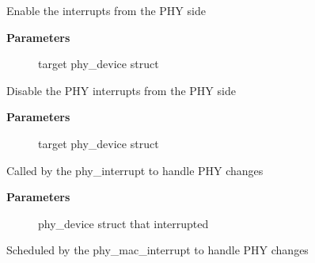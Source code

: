 \documentclass[a4paper,8pt,english]{sphinxmanual}
\begin{document}
\begin{fulllineitems}
\label{networking/kapi:c.phy_enable_interrupts}
Enable the interrupts from the PHY side

\end{fulllineitems}


\textbf{Parameters}
\begin{description}
\item[{}] \leavevmode
target phy\_device struct

\end{description}

\begin{fulllineitems}
\label{networking/kapi:c.phy_disable_interrupts}
Disable the PHY interrupts from the PHY side

\end{fulllineitems}


\textbf{Parameters}
\begin{description}
\item[{}] \leavevmode
target phy\_device struct

\end{description}

\begin{fulllineitems}
\label{networking/kapi:c.phy_change}
Called by the phy\_interrupt to handle PHY changes

\end{fulllineitems}


\textbf{Parameters}
\begin{description}
\item[{}] \leavevmode
phy\_device struct that interrupted

\end{description}

\begin{fulllineitems}
\label{networking/kapi:c.phy_change_work}
Scheduled by the phy\_mac\_interrupt to handle PHY changes

\end{fulllineitems}
\end{document}
